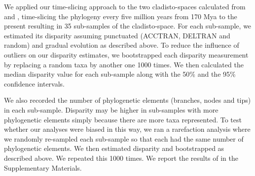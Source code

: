 \documentclass[12pt,letterpaper]{article}
\begin{document}
We applied our time-slicing approach to the two cladisto-spaces calculated from \cite{Slater2012MEE} and \cite{beckancient2014}, time-slicing the phylogeny every five million years from 170 Mya to the present resulting in 35 sub-samples of the cladisto-space. %
For each sub-sample, we estimated its disparity assuming punctuated (ACCTRAN, DELTRAN and random) and gradual evolution as described above.
To reduce the influence of outliers on our disparity estimates, we bootstrapped each disparity measurement by replacing a random taxa by another one 1000 times.
We then calculated the median disparity value for each sub-sample along with the 50\% and the 95\% confidence intervals.

We also recorded the number of phylogenetic elements (branches, nodes and tips) in each sub-sample.
Disparity may be higher in sub-samples with more phylogenetic elements simply because there are more taxa represented. To test whether our analyses were biased in this way, we ran a rarefaction analysis where we randomly re-sampled each sub-sample so that each had the same number of phylogenetic elements. We then estimated disparity and bootstrapped as described above. We repeated this 1000 times. %
We report the results of in the Supplementary Materials. %
\end{document}
